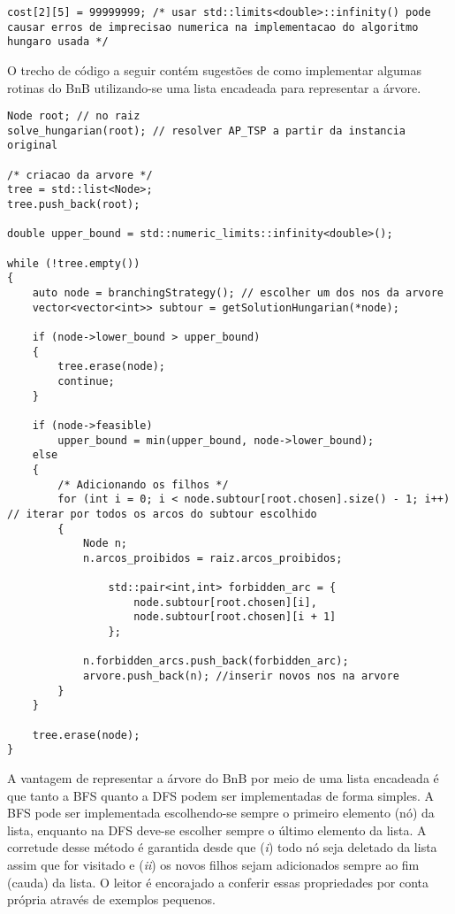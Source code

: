{\begin{lstlisting}[style=cplusplusListStyle]
cost[2][5] = 99999999; /* usar std::limits<double>::infinity() pode causar erros de imprecisao numerica na implementacao do algoritmo hungaro usada */
\end{lstlisting}

O trecho de código a seguir contém sugestões de como implementar algumas rotinas do BnB utilizando-se uma lista encadeada para representar a árvore.     

\begin{lstlisting}[style=cplusplusListStyle]
Node root; // no raiz
solve_hungarian(root); // resolver AP_TSP a partir da instancia original

/* criacao da arvore */
tree = std::list<Node>;
tree.push_back(root);

double upper_bound = std::numeric_limits::infinity<double>();

while (!tree.empty())
{
	auto node = branchingStrategy(); // escolher um dos nos da arvore
	vector<vector<int>> subtour = getSolutionHungarian(*node);

	if (node->lower_bound > upper_bound)
	{
		tree.erase(node);
		continue;
	}

	if (node->feasible)
		upper_bound = min(upper_bound, node->lower_bound);
	else 
	{
		/* Adicionando os filhos */
		for (int i = 0; i < node.subtour[root.chosen].size() - 1; i++) // iterar por todos os arcos do subtour escolhido
		{
		    Node n;
		    n.arcos_proibidos = raiz.arcos_proibidos;
		        
				std::pair<int,int> forbidden_arc = {
					node.subtour[root.chosen][i],
					node.subtour[root.chosen][i + 1]
				};
		        
		    n.forbidden_arcs.push_back(forbidden_arc);
		    arvore.push_back(n); //inserir novos nos na arvore
		}
	}

	tree.erase(node);
}
\end{lstlisting}

A vantagem de representar a árvore do BnB por meio de uma lista encadeada é que tanto a BFS quanto a DFS podem ser implementadas de forma simples. A BFS pode ser implementada escolhendo-se sempre o primeiro elemento (nó) da lista, enquanto na DFS deve-se escolher sempre o último elemento da lista. A corretude desse método é garantida desde que (\textit{i}) todo nó seja deletado da lista assim que for visitado e (\textit{ii}) os novos filhos sejam adicionados sempre ao fim (cauda) da lista. O leitor é encorajado a conferir essas propriedades por conta própria através de exemplos pequenos.  

}
